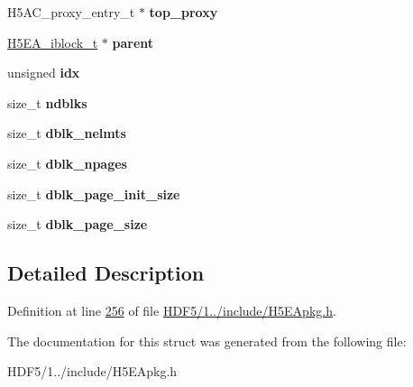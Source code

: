 \begin{DoxyCompactItemize}
H5\+A\+C\+\_\+proxy\+\_\+entry\+\_\+t $\ast$ {\bfseries top\+\_\+proxy}
\item 
\mbox{\label{struct_h5_e_a__sblock__t_aaf096ef2e86c45a36f32fd49d71f7d59}} 
\hyperlink{struct_h5_e_a__iblock__t}{H5\+E\+A\+\_\+iblock\+\_\+t} $\ast$ {\bfseries parent}
\item 
\mbox{\label{struct_h5_e_a__sblock__t_a11d0f2f45b248aee6f58dad20a6cee85}} 
unsigned {\bfseries idx}
\item 
\mbox{\label{struct_h5_e_a__sblock__t_a8e25115952f33e8c6e2fa4dbd262b513}} 
size\+\_\+t {\bfseries ndblks}
\item 
\mbox{\label{struct_h5_e_a__sblock__t_ad8089c7873173846015595b58ef20509}} 
size\+\_\+t {\bfseries dblk\+\_\+nelmts}
\item 
\mbox{\label{struct_h5_e_a__sblock__t_adf3a677bc35eb29fd7af92fe0a4cef39}} 
size\+\_\+t {\bfseries dblk\+\_\+npages}
\item 
\mbox{\label{struct_h5_e_a__sblock__t_a7385e780347689d7f806cb94382285a4}} 
size\+\_\+t {\bfseries dblk\+\_\+page\+\_\+init\+\_\+size}
\item 
\mbox{\label{struct_h5_e_a__sblock__t_acd47491eb8580416cf8f4c90ed3f9e24}} 
size\+\_\+t {\bfseries dblk\+\_\+page\+\_\+size}
\end{DoxyCompactItemize}


\subsection{Detailed Description}


Definition at line \hyperlink{_h_d_f5_21_810_81_2include_2_h5_e_apkg_8h_source_l00256}{256} of file \hyperlink{_h_d_f5_21_810_81_2include_2_h5_e_apkg_8h_source}{H\+D\+F5/1../include/\+H5\+E\+Apkg.\+h}.



The documentation for this struct was generated from the following file\+:\begin{DoxyCompactItemize}
\item 
H\+D\+F5/1../include/\+H5\+E\+Apkg.\+h\end{DoxyCompactItemize}

